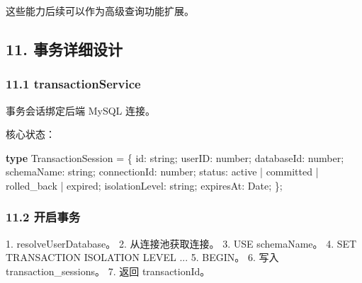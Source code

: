 \documentclass[
  a4paper,
  UTF8]{ctexart}
\newenvironment{Shaded}{}{}
\newcommand{\DataTypeTok}[1]{\textcolor[rgb]{0.56,0.13,0.00}{#1}}
\newcommand{\KeywordTok}[1]{\textcolor[rgb]{0.00,0.44,0.13}{\textbf{#1}}}
\newcommand{\NormalTok}[1]{#1}
\newcommand{\OperatorTok}[1]{\textcolor[rgb]{0.40,0.40,0.40}{#1}}
\newcommand{\StringTok}[1]{\textcolor[rgb]{0.25,0.44,0.63}{#1}}
\begin{document}
这些能力后续可以作为高级查询功能扩展。

\hypertarget{ux4e8bux52a1ux8be6ux7ec6ux8bbeux8ba1}{%
\subsection{11.
事务详细设计}\label{ux4e8bux52a1ux8be6ux7ec6ux8bbeux8ba1}}

\hypertarget{transactionservice}{%
\subsubsection{11.1 transactionService}\label{transactionservice}}

事务会话绑定后端 MySQL 连接。

核心状态：

\begin{Shaded}
\begin{Highlighting}[]
\KeywordTok{type}\NormalTok{ TransactionSession }\OperatorTok{=}\NormalTok{ \{}
\NormalTok{  id}\OperatorTok{:} \DataTypeTok{string}\OperatorTok{;}
\NormalTok{  userID}\OperatorTok{:} \DataTypeTok{number}\OperatorTok{;}
\NormalTok{  databaseId}\OperatorTok{:} \DataTypeTok{number}\OperatorTok{;}
\NormalTok{  schemaName}\OperatorTok{:} \DataTypeTok{string}\OperatorTok{;}
\NormalTok{  connectionId}\OperatorTok{:} \DataTypeTok{number}\OperatorTok{;}
\NormalTok{  status}\OperatorTok{:} \StringTok{\textquotesingle{}active\textquotesingle{}} \OperatorTok{|} \StringTok{\textquotesingle{}committed\textquotesingle{}} \OperatorTok{|} \StringTok{\textquotesingle{}rolled\_back\textquotesingle{}} \OperatorTok{|} \StringTok{\textquotesingle{}expired\textquotesingle{}}\OperatorTok{;}
\NormalTok{  isolationLevel}\OperatorTok{:} \DataTypeTok{string}\OperatorTok{;}
\NormalTok{  expiresAt}\OperatorTok{:}\NormalTok{ Date}\OperatorTok{;}
\NormalTok{\}}\OperatorTok{;}
\end{Highlighting}
\end{Shaded}

\hypertarget{ux5f00ux542fux4e8bux52a1}{%
\subsubsection{11.2 开启事务}\label{ux5f00ux542fux4e8bux52a1}}

\begin{Shaded}
\begin{Highlighting}[]
\NormalTok{1. resolveUserDatabase。}
\NormalTok{2. 从连接池获取连接。}
\NormalTok{3. USE \textasciigrave{}schemaName\textasciigrave{}。}
\NormalTok{4. SET TRANSACTION ISOLATION LEVEL ...}
\NormalTok{5. BEGIN。}
\NormalTok{6. 写入 transaction\_sessions。}
\NormalTok{7. 返回 transactionId。}
\end{Highlighting}
\end{Shaded}
\end{document}
